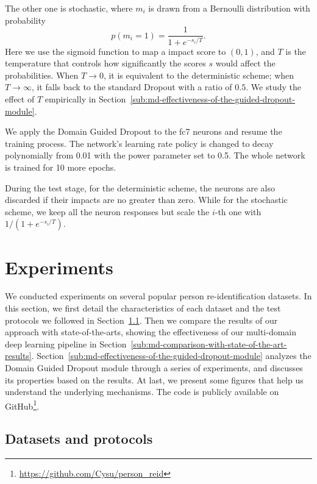 The other one is stochastic, where $m_i$ is drawn from a Bernoulli distribution with probability
\begin{equation} \label{eq:md-stochastic-guided-dropout}
   p(m_i=1) = \frac{1}{1+e^{-s_i/T}}.
\end{equation}
Here we use the sigmoid function to map a impact score to $(0,1)$, and $T$ is the temperature that controls how significantly the scores $s$ would affect the probabilities. When $T\to 0$, it is equivalent to the deterministic scheme; when $T\to \infty$, it falls back to the standard Dropout with a ratio of $0.5$. We study the effect of $T$ empirically in Section~\ref{sub:md-effectiveness-of-the-guided-dropout-module}.

We apply the Domain Guided Dropout to the fc7 neurons and resume the training process. The network's learning rate policy is changed to decay polynomially from 0.01 with the power parameter set to 0.5. The whole network is trained for 10 more epochs.

During the test stage, for the deterministic scheme, the neurons are also discarded if their impacts are no greater than zero. While for the stochastic scheme, we keep all the neuron responses but scale the $i$-th one with $1/(1+e^{-s_i/T})$.


\section{Experiments} %
\label{sec:md-experiments}
We conducted experiments on several popular person re-identification datasets. In this section, we first detail the characteristics of each dataset and the test protocols we followed in Section~\ref{sub:md-datasets-and-protocols}. Then we compare the results of our approach with state-of-the-arts, showing the effectiveness of our multi-domain deep learning pipeline in Section~\ref{sub:md-comparison-with-state-of-the-art-results}. Section~\ref{sub:md-effectiveness-of-the-guided-dropout-module} analyzes the Domain Guided Dropout module through a series of experiments, and discusses its properties based on the results. At last, we present some figures that help us understand the underlying mechanisms. The code is publicly available on GitHub\footnote{\url{https://github.com/Cysu/person_reid}}.

\subsection{Datasets and protocols} %
\label{sub:md-datasets-and-protocols}


